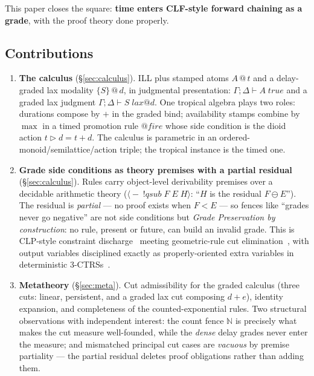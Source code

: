 \documentclass[11pt]{article}
\makeatletter
\newcommand{\lax}[2]{\{#1\}\mathbin{@}#2}       %
\newcommand{\act}{\mathbin{\rhd}}                %
\newcommand{\res}{\mathbin{\ominus}}             %
\newcommand{\tr}{\;\mathit{true}}                %
\newcommand{\laxjdg}[1]{\;\mathit{lax}@{#1}}    %
\newcommand{\NN}{\mathbb{N}}                     %
\newcommand{\stmp}[2]{#1\mathbin{@}#2}           %
\newcommand{\thprem}[1]{\langle\!\!\!-\;#1\rangle}  %
\theoremstyle{definition}
\theoremstyle{remark}
\makeatother
\begin{document}
This paper closes the square: \textbf{time enters CLF-style forward chaining as
a grade}, with the proof theory done properly.

\subsection{Contributions}

\begin{enumerate}
\item \textbf{The calculus} (\S\ref{sec:calculus}).  ILL plus stamped atoms
  $\stmp{A}{t}$ and a delay-graded lax modality $\lax{S}{d}$, in judgmental
  presentation: $\Gamma; \Delta \vdash A\tr$ and a graded lax judgment
  $\Gamma; \Delta \vdash S\laxjdg{d}$.  One tropical algebra plays two roles:
  durations compose by $+$ in the graded bind; availability stamps combine by
  $\max$ in a timed promotion rule $\mathit{@fire}$ whose side condition is the
  dioid action $t \act d = t+d$.  The calculus is parametric in an
  ordered-monoid/semilattice/action triple; the tropical instance is the timed
  one.

\item \textbf{Grade side conditions as theory premises with a partial residual}
  (\S\ref{sec:calculus}).  Rules carry object-level derivability premises over a
  decidable arithmetic theory ($\thprem{!\mathit{qsub}\;F\;E\;H}$: ``$H$ is the
  residual $F \res E$'').  The residual is \emph{partial} --- no proof exists
  when $F < E$ --- so fences like ``grades never go negative'' are not side
  conditions but \emph{Grade Preservation by construction}: no rule, present or
  future, can build an invalid grade.  This is CLP-style constraint
  discharge~\cite{LassezMcAloon1990} meeting geometric-rule cut
  elimination~\cite{NegriVonPlato1998}, with output variables disciplined
  exactly as properly-oriented extra variables in deterministic
  3-CTRSs~\cite{Ohlebusch2002}.

\item \textbf{Metatheory} (\S\ref{sec:meta}).  Cut admissibility for the graded
  calculus (three cuts: linear, persistent, and a graded lax cut composing
  $d+e$), identity expansion, and completeness of the counted-exponential rules.
  Two structural observations with independent interest: the count fence $\NN$
  is precisely what makes the cut measure well-founded, while the \emph{dense}
  delay grades never enter the measure; and mismatched principal cut cases are
  \emph{vacuous} by premise partiality --- the partial residual deletes proof
  obligations rather than adding them.


\end{enumerate}
\end{document}
